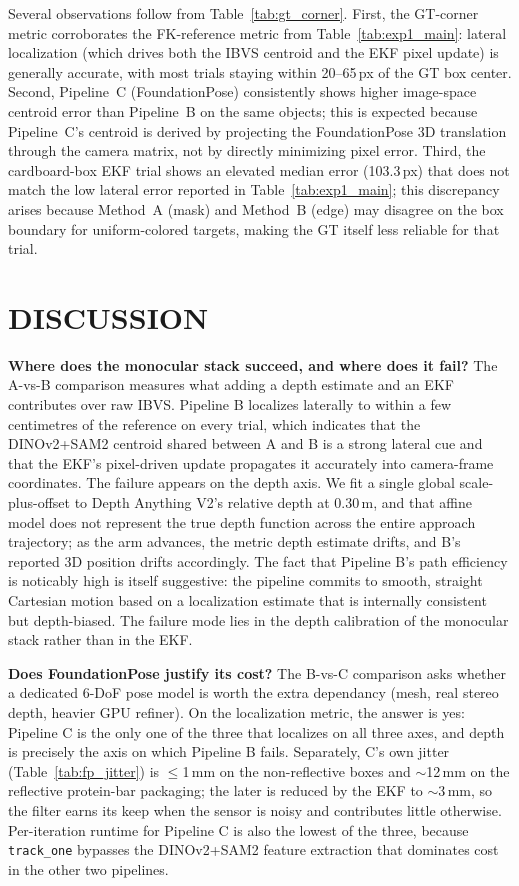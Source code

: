 \documentclass[letterpaper, 10 pt, conference]{ieeeconf}  %
\begin{document}
Several observations follow from Table~\ref{tab:gt_corner}. First, the GT-corner metric corroborates the FK-reference metric from Table~\ref{tab:exp1_main}: lateral localization (which drives both the IBVS centroid and the EKF pixel update) is generally accurate, with most trials staying within 20--65\,px of the GT box center. Second, Pipeline~C (FoundationPose) consistently shows higher image-space centroid error than Pipeline~B on the same objects; this is expected because Pipeline~C's centroid is derived by projecting the FoundationPose 3D translation through the camera matrix, not by directly minimizing pixel error. Third, the cardboard-box EKF trial shows an elevated median error (103.3\,px) that does not match the low lateral error reported in Table~\ref{tab:exp1_main}; this discrepancy arises because Method~A (mask) and Method~B (edge) may disagree on the box boundary for uniform-colored targets, making the GT itself less reliable for that trial.

\section{DISCUSSION}

\textbf{Where does the monocular stack succeed, and where does it fail?}
The A-vs-B comparison measures what adding a depth estimate and an EKF contributes over raw IBVS. Pipeline B localizes laterally to within a few centimetres of the reference on every trial, which indicates that the DINOv2+SAM2 centroid shared between A and B is a strong lateral cue and that the EKF's pixel-driven update propagates it accurately into camera-frame coordinates. The failure appears on the depth axis. We fit a single global scale-plus-offset to Depth Anything V2's relative depth at 0.30\,m, and that affine model does not represent the true depth function across the entire approach trajectory; as the arm advances, the metric depth estimate drifts, and B's reported 3D position drifts accordingly. The fact that Pipeline B's path efficiency is noticably high is itself suggestive: the pipeline commits to smooth, straight Cartesian motion based on a localization estimate that is internally consistent but depth-biased. The failure mode lies in the depth calibration of the monocular stack rather than in the EKF.

\textbf{Does FoundationPose justify its cost?}
The B-vs-C comparison asks whether a dedicated 6-DoF pose model is worth the extra dependancy (mesh, real stereo depth, heavier GPU refiner). On the localization metric, the answer is yes: Pipeline C is the only one of the three that localizes on all three axes, and depth is precisely the axis on which Pipeline B fails. Separately, C's own jitter (Table~\ref{tab:fp_jitter}) is $\leq$1\,mm on the non-reflective boxes and $\sim$12\,mm on the reflective protein-bar packaging; the later is reduced by the EKF to $\sim$3\,mm, so the filter earns its keep when the sensor is noisy and contributes little otherwise. Per-iteration runtime for Pipeline C is also the lowest of the three, because \texttt{track\_one} bypasses the DINOv2+SAM2 feature extraction that dominates cost in the other two pipelines.
\end{document}
